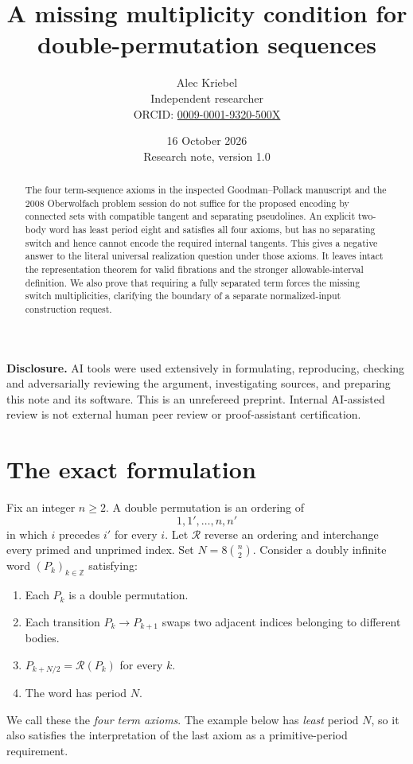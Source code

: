 \documentclass[11pt]{article}
\title{A missing multiplicity condition for double-permutation sequences}
\author{Alec Kriebel\\
  \small Independent researcher\\
  \small ORCID: \href{https://orcid.org/0009-0001-9320-500X}{0009-0001-9320-500X}}
\date{16 October 2026\\ \small Research note, version 1.0}
\newcommand{\rev}{\mathcal R}
\begin{document}
\maketitle
\begin{abstract}
The four term-sequence axioms in the inspected Goodman--Pollack manuscript
and the 2008 Oberwolfach problem session do not suffice for the proposed
encoding by connected sets with compatible tangent and separating
pseudolines. An explicit two-body word has least period eight and satisfies
all four axioms, but has no separating switch and hence cannot encode
the required internal tangents. This gives a negative answer to the literal
universal realization question under those axioms. It leaves intact the
representation theorem for valid fibrations and the stronger
allowable-interval definition. We also prove that requiring a fully
separated term forces the missing switch multiplicities, clarifying the
boundary of a separate normalized-input construction request.
\end{abstract}

\noindent\textbf{Disclosure.}
AI tools were used extensively in formulating, reproducing, checking and
adversarially reviewing the argument, investigating sources, and preparing
this note and its software. This is an unrefereed preprint. Internal
AI-assisted review is not external human peer review or proof-assistant
certification.

\section{The exact formulation}

Fix an integer $n\ge2$. A double permutation is an ordering of
\[
  1,1',\ldots,n,n'
\]
in which $i$ precedes $i'$ for every $i$. Let $\rev$ reverse an ordering
and interchange every primed and unprimed index. Set $N=8\binom n2$.
Consider a doubly infinite word $(P_k)_{k\in\mathbb Z}$ satisfying:
\begin{enumerate}
\item Each $P_k$ is a double permutation.
\item Each transition $P_k\longrightarrow P_{k+1}$ swaps two adjacent
indices belonging to different bodies.
\item $P_{k+N/2}=\rev(P_k)$ for every $k$.
\item The word has period $N$.
\end{enumerate}
We call these the \emph{four term axioms}. The example below has
\emph{least} period $N$, so it also satisfies the interpretation of the
last axiom as a primitive-period requirement.
\end{document}
